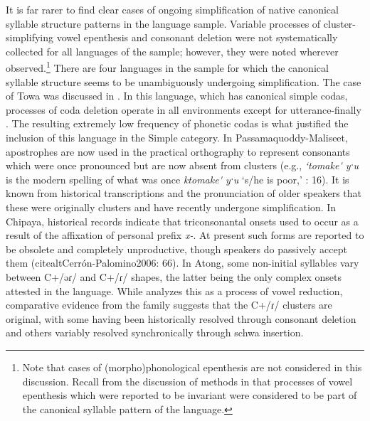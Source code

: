   It is far rarer to find clear cases of ongoing simplification of native canonical syllable structure patterns in the language sample. Variable processes of cluster-simplifying vowel epenthesis and consonant deletion were not systematically collected for all languages of the sample; however, they were noted wherever observed.\footnote{{Note that cases of (morpho)phonological epenthesis are not considered in this discussion. Recall from the discussion of methods in  that processes of vowel epenthesis which were reported to be invariant were considered to be part of the canonical syllable pattern of the language.}} There are four languages in the sample for which the canonical syllable structure seems to be unambiguously undergoing simplification. The case of Towa was discussed in . In this language, which has canonical simple codas, processes of coda deletion operate in all environments except for utterance-finally \citep[22-4]{Yumitani1998}. The resulting extremely low frequency of phonetic codas is what justified the inclusion of this language in the Simple category. In Passamaquoddy-Maliseet, apostrophes are now used in the practical orthography to represent consonants which were once pronounced but are now absent from clusters (e.g., \textit{‘tomake\'{} yˑu} is the modern spelling of what was once \textit{ktomake\'{} yˑu} ‘s/he is poor,’ \citealt{Leavitt1996}: 16). It is known from historical transcriptions and the pronunciation of older speakers that these were originally clusters and have recently undergone simplification. In Chipaya, historical records indicate that triconsonantal onsets used to occur as a result of the affixation of personal prefix \textit{x-}. At present such forms are reported to be obsolete and completely unproductive, though speakers do passively accept them (citealt{Cerrón-Palomino2006}: 66). In Atong, some non-initial syllables vary between C+/əɾ/ and C+/ɾ/ shapes, the latter being the only complex onsets attested in the language. While \citet[30--32]{VanBreugel2008} analyzes this as a process of vowel reduction, comparative evidence from the family suggests that the C+/ɾ/ clusters are original, with some having been historically resolved through consonant deletion and others variably resolved synchronically through schwa insertion.

